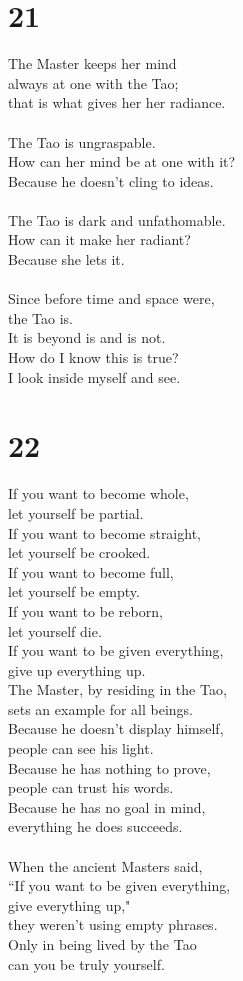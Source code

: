 \documentclass[b5paper, 12pt, oneside]{book}
\begin{document}
\chapter*{21}
The Master keeps her mind\\
always at one with the Tao;\\
that is what gives her her radiance.\\
\\
The Tao is ungraspable.\\
How can her mind be at one with it?\\
Because he doesn't cling to ideas.\\
\\
The Tao is dark and unfathomable.\\
How can it make her radiant?\\
Because she lets it.\\
\\
Since before time and space were,\\
the Tao is.\\
It is beyond is and is not.\\
How do I know this is true?\\
I look inside myself and see.\\

\chapter*{22}
If you want to become whole,\\
let yourself be partial.\\
If you want to become straight,\\
let yourself be crooked.\\
If you want to become full,\\
let yourself be empty.\\
If you want to be reborn,\\
let yourself die.\\
If you want to be given everything,\\
give up everything up.
\\
The Master, by residing in the Tao,\\
sets an example for all beings.\\
Because he doesn't display himself,\\
people can see his light.\\
Because he has nothing to prove,\\
people can trust his words.\\
Because he has no goal in mind,\\
everything he does succeeds.\\
\\
When the ancient Masters said,\\
``If you want to be given everything,\\
give everything up,"\\
they weren't using empty phrases.\\
Only in being lived by the Tao\\
can you be truly yourself.\\
\end{document}
